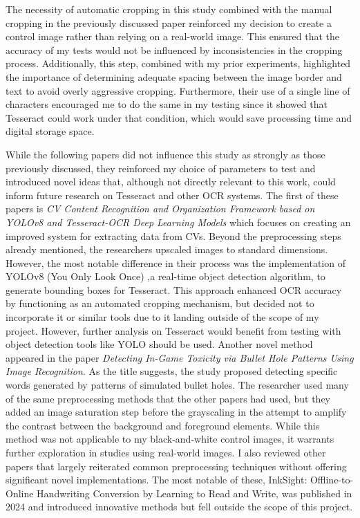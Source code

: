 \documentclass[10pt,twocolumn]{article}
\begin{document}
The necessity of automatic cropping in this study combined with the manual cropping in the previously discussed paper reinforced my decision to create a control image rather than relying on a real-world image. This ensured that the accuracy of my tests would not be influenced by inconsistencies in the cropping process. Additionally, this step, combined with my prior experiments, highlighted the importance of determining adequate spacing between the image border and text to avoid overly aggressive cropping. Furthermore, their use of a single line of characters encouraged me to do the same in my testing since it showed that Tesseract could work under that condition, which would save processing time and digital storage space.

While the following papers did not influence this study as strongly as those previously discussed, they reinforced my choice of parameters to test and introduced novel ideas that, although not directly relevant to this work, could inform future research on Tesseract and other OCR systems. The first of these papers is  \textit{CV Content Recognition and Organization Framework based on YOLOv8 and Tesseract-OCR Deep Learning Models} which focuses on creating an improved system for extracting data from CVs. Beyond the preprocessing steps already mentioned, the researchers upscaled images to standard dimensions. However, the most notable difference in their process was the implementation of YOLOv8 (You Only Look Once) ,a real-time object detection algorithm, to generate bounding boxes for Tesseract\cite{yolo}. This approach enhanced OCR accuracy by functioning as an automated cropping mechanism, but decided not to incorporate it or similar tools due to it landing outside of the scope of my project. However, further analysis on Tesseract would benefit from testing with  object detection tools like YOLO should be used.  Another novel method appeared in the paper \textit{Detecting In-Game Toxicity via Bullet Hole Patterns Using Image Recognition}. As the title suggests, the study proposed detecting specific words generated by patterns of simulated bullet holes. The researcher used many of the same preprocessing methods that the other papers had used, but they added an image saturation step before the grayscaling in the attempt to amplify the contrast between the background and foreground elements\cite{bullets}. While this method was not applicable to my black-and-white control images, it warrants further exploration in studies using real-world images. I also reviewed other papers that largely reiterated common preprocessing techniques without offering significant novel implementations. The most notable of these, InkSight: Offline-to-Online Handwriting Conversion by Learning to Read and Write, was published in 2024 and  introduced innovative methods but fell outside the scope of this project\cite{inksight}.
\end{document}
